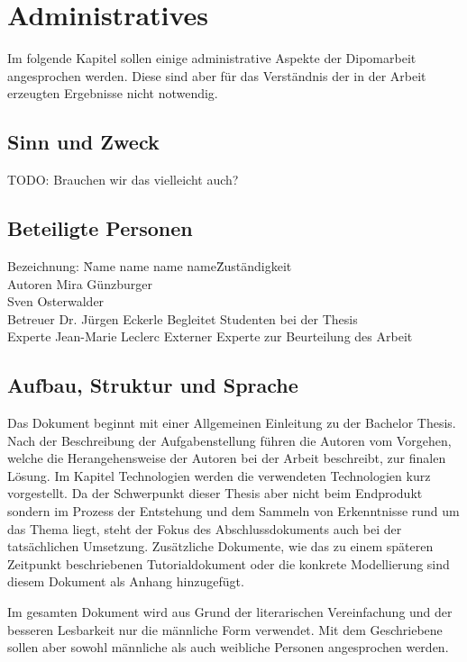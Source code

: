 \chapter{Administratives}
\label{chap:administratives}

Im folgende Kapitel sollen einige administrative Aspekte der Dipomarbeit angesprochen werden. Diese sind aber für das Verständnis der in der Arbeit erzeugten Ergebnisse nicht notwendig.

\section{Sinn und Zweck}
\label{sec:admin_sinn}
TODO: Brauchen wir das vielleicht auch?
\section{Beteiligte Personen}
\label{sec:admin_beteiligte}
\begin{tabbing} %
Bezeichnung: \= Name name name name\= Zuständigkeit \kill \\
  Autoren           \>  Mira Günzburger   \> \\
										\> Sven Osterwalder    \> \\
	Betreuer           \> Dr. Jürgen Eckerle    \> Begleitet Studenten bei der Thesis\\
	Experte           \>  Jean-Marie Leclerc  \> Externer Experte zur Beurteilung des Arbeit
\end{tabbing}

\section{Aufbau, Struktur und Sprache}
\label{sec:admin_aufbau}
Das Dokument beginnt mit einer Allgemeinen Einleitung zu der Bachelor Thesis. Nach der Beschreibung der Aufgabenstellung führen die Autoren vom Vorgehen, welche die Herangehensweise der Autoren bei der Arbeit beschreibt, zur finalen Lösung. Im Kapitel Technologien werden die verwendeten Technologien kurz vorgestellt. Da der Schwerpunkt dieser Thesis aber nicht beim Endprodukt sondern im Prozess der Entstehung und dem Sammeln von Erkenntnisse rund um das Thema liegt, steht der Fokus des Abschlussdokuments auch bei der tatsächlichen Umsetzung. 
Zusätzliche Dokumente, wie das zu einem späteren Zeitpunkt beschriebenen Tutorialdokument oder die konkrete Modellierung sind diesem Dokument als Anhang hinzugefügt.

Im gesamten Dokument wird aus Grund der literarischen Vereinfachung und der besseren Lesbarkeit nur die männliche Form verwendet. Mit dem Geschriebene sollen aber sowohl  männliche als auch  weibliche Personen angesprochen werden.

